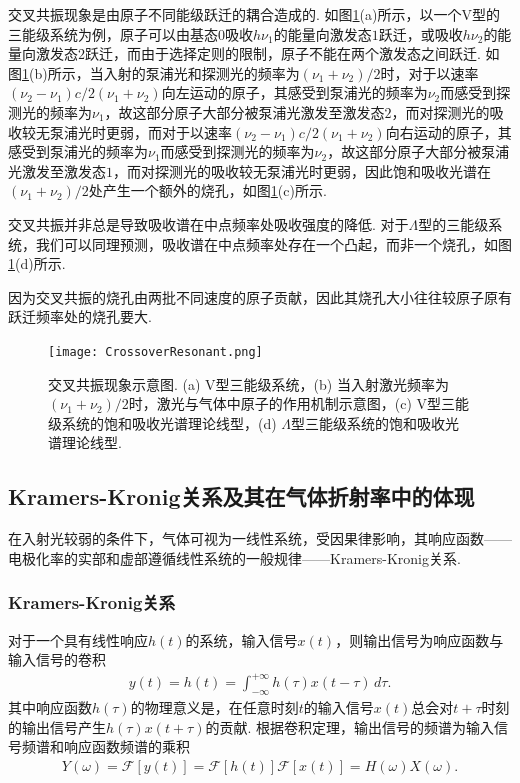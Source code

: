 \documentclass[a4paper, 10pt]{article}
\begin{document}
\begin{multicols}{2}
交叉共振现象是由原子不同能级跃迁的耦合造成的. 如图\ref{crossover-resonant}(a)所示，以一个V型的三能级系统为例，原子可以由基态$0$吸收$h\nu_1$的能量向激发态$1$跃迁，或吸收$h\nu_2$的能量向激发态$2$跃迁，而由于选择定则的限制，原子不能在两个激发态之间跃迁. 如图\ref{crossover-resonant}(b)所示，当入射的泵浦光和探测光的频率为$(\nu_1+\nu_2)/2$时，对于以速率$(\nu_2-\nu_1)c/2(\nu_1+\nu_2)$向左运动的原子，其感受到泵浦光的频率为$\nu_2$而感受到探测光的频率为$\nu_1$，故这部分原子大部分被泵浦光激发至激发态$2$，而对探测光的吸收较无泵浦光时更弱，而对于以速率$(\nu_2-\nu_1)c/2(\nu_1+\nu_2)$向右运动的原子，其感受到泵浦光的频率为$\nu_1$而感受到探测光的频率为$\nu_2$，故这部分原子大部分被泵浦光激发至激发态$1$，而对探测光的吸收较无泵浦光时更弱，因此饱和吸收光谱在$(\nu_1+\nu_2)/2$处产生一个额外的烧孔，如图\ref{crossover-resonant}(c)所示.

交叉共振并非总是导致吸收谱在中点频率处吸收强度的降低. 对于$\Lambda$型的三能级系统，我们可以同理预测，吸收谱在中点频率处存在一个凸起，而非一个烧孔，如图\ref{crossover-resonant}(d)所示.

因为交叉共振的烧孔由两批不同速度的原子贡献，因此其烧孔大小往往较原子原有跃迁频率处的烧孔要大.

\begin{figure}[H]
    \centering
    \texttt{[image: CrossoverResonant.png]}
    \caption{交叉共振现象示意图. (a) V型三能级系统，(b) 当入射激光频率为$(\nu_1+\nu_2)/2$时，激光与气体中原子的作用机制示意图，(c) V型三能级系统的饱和吸收光谱理论线型，(d) $\Lambda$型三能级系统的饱和吸收光谱理论线型.}
    \label{crossover-resonant}
\end{figure}

\subsection{Kramers-Kronig关系及其在气体折射率中的体现}
在入射光较弱的条件下，气体可视为一线性系统，受因果律影响，其响应函数——电极化率的实部和虚部遵循线性系统的一般规律——Kramers-Kronig关系.

\subsubsection{Kramers-Kronig关系}
对于一个具有线性响应$h(t)$的系统，输入信号$x(t)$，则输出信号为响应函数与输入信号的卷积
\begin{align}
    y(t)=h(t)=\int_{-\infty}^{+\infty}h(\tau)x(t-\tau)\,d\tau.
\end{align}
其中响应函数$h(\tau)$的物理意义是，在任意时刻$t$的输入信号$x(t)$总会对$t+\tau$时刻的输出信号产生$h(\tau)x(t+\tau)$的贡献.
根据卷积定理，输出信号的频谱为输入信号频谱和响应函数频谱的乘积
\begin{align}
    Y(\omega)=\mathscr{F}[y(t)]=\mathscr{F}[h(t)]\mathscr{F}[x(t)]=H(\omega)X(\omega).
\end{align}


\end{multicols}
\end{document}
